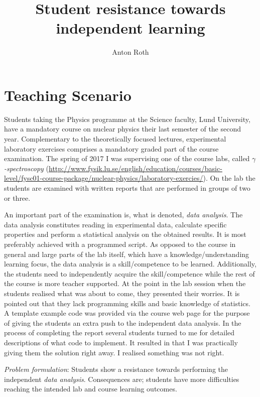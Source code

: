 \documentclass[]{article}
\title{Student resistance towards independent learning}
\author{Anton Roth}
\begin{document}

\section*{Teaching Scenario}
Students taking the Physics programme at the Science faculty, Lund University, have a mandatory course on nuclear physics their last semester of the second year.
Complementary to the theoretically focused lectures, experimental laboratory exercises comprises a mandatory graded part of the course examination.
The spring of 2017 I was supervising one of the course labs, called {\it $\gamma$-spectroscopy} (\url{http://www.fysik.lu.se/english/education/courses/basic-level/fysc01-course-package/nuclear-physics/laboratory-exercies/}).
On the lab the students are examined with written reports that are performed in groups of two or three.

An important part of the examination is, what is denoted, {\it data analysis}.
The data analysis constitutes reading in experimental data, calculate specific properties and perform a statistical analysis on the obtained results.
It is most preferably achieved with a programmed script.
As opposed to the course in general and large parts of the lab itself, which have a knowledge/understanding learning focus, the data analysis is a skill/competence to be learned.
Additionally, the students need to independently acquire the skill/competence while the rest of the course is more teacher supported.
At the point in the lab session when the students realised what was about to come, they presented their worries.
It is pointed out that they lack programming skills and basic knowledge of statistics.
A template example code was provided via the course web page for the purpose of giving the students an extra push to the independent data analysis.
In the process of completing the report several students turned to me for detailed descriptions of what code to implement.
It resulted in that I was practically giving them the solution right away.
I realised something was not right.

{\it Problem formulation}: Students show a resistance towards performing the independent {\it data analysis}. Consequences are; students have more difficulties reaching the intended lab and course learning outcomes.
\end{document}
